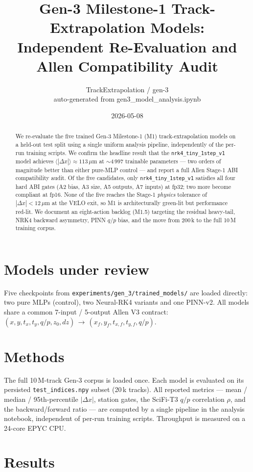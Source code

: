 \documentclass[11pt,a4paper]{article}
\title{Gen-3 Milestone-1 Track-Extrapolation Models:\\
       Independent Re-Evaluation and Allen Compatibility Audit}
\author{TrackExtrapolation / gen-3 \\ \small auto-generated from gen3\_model\_analysis.ipynb}
\date{2026-05-08}
\begin{document}
\maketitle

\begin{abstract}
We re-evaluate the five trained Gen-3 Milestone-1 (M1) track-extrapolation
models on a held-out test split using a single uniform analysis pipeline,
independently of the per-run training scripts. We confirm the headline
result that the \texttt{nrk4\_tiny\_1step\_v1} model achieves
$\langle|\Delta x|\rangle \approx 113\,\mu\mathrm{m}$ at
$\sim$4\,997 trainable parameters --- two orders of magnitude better than
either pure-MLP control --- and report a full Allen Stage-1 ABI compatibility
audit. Of the five candidates, only \texttt{nrk4\_tiny\_1step\_v1} satisfies
all four hard ABI gates (A2 bias, A3 size, A5 outputs, A7 inputs) at
fp32; two more become compliant at fp16. None of the five reaches the
Stage-1 \emph{physics} tolerance of $|\Delta x|<12\,\mu\mathrm{m}$ at
the VELO exit, so M1 is architecturally green-lit but performance red-lit.
We document an eight-action backlog (M1.5) targeting the residual
heavy-tail, NRK4 backward asymmetry, PINN $q/p$ bias, and the move from
200\,k to the full 10\,M training corpus.
\end{abstract}

\section{Models under review}
Five checkpoints from \texttt{experiments/gen\_3/trained\_models/} are
loaded directly: two pure MLPs (control), two Neural-RK4 variants and one
PINN-v2. All models share a common 7-input / 5-output Allen V3 contract:
$(x, y, t_x, t_y, q/p, z_0, dz)\,\to\,(x_f, y_f, t_{x,f}, t_{y,f}, q/p)$.

\section{Methods}
The full 10\,M-track Gen-3 corpus is loaded once. Each model is evaluated
on its persisted \texttt{test\_indices.npy} subset (20\,k tracks). All
reported metrics --- mean / median / 95th-percentile $|\Delta x|$, station
gates, the SciFi-T3 $q/p$ correlation $\rho$, and the backward/forward
ratio --- are computed by a single pipeline in the analysis notebook,
independent of per-run training scripts. Throughput is measured on a 24-core
EPYC CPU.

\section{Results}
\end{document}
